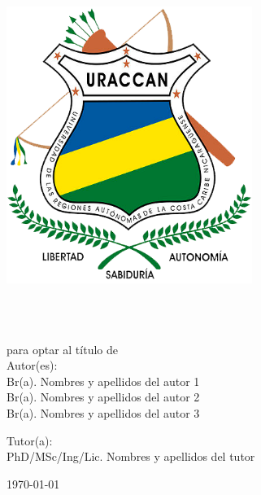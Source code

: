 \begin{titlepage}
    \centering
    \begin{minipage}{0.2\textwidth}
        \centering
        \includegraphics[width=0.6\textwidth]{images/uraccan_logo.png}
    \end{minipage}%
    \begin{minipage}{0.8\textwidth}
        \centering
        \Large{\textbf{\universidad}}\\
    \end{minipage}

    \vfill
    \tipoinvestigacion\\para optar al título de \tituloopta\\

    \vfill
    Autor(es):\\
    Br(a). Nombres y apellidos del autor 1\\
    Br(a). Nombres y apellidos del autor 2\\
    Br(a). Nombres y apellidos del autor 3

    \vfill
    Tutor(a):\\
    PhD/MSc/Ing/Lic. Nombres y apellidos del tutor


    \vfill
    \small{\today{}}\\
\end{titlepage}